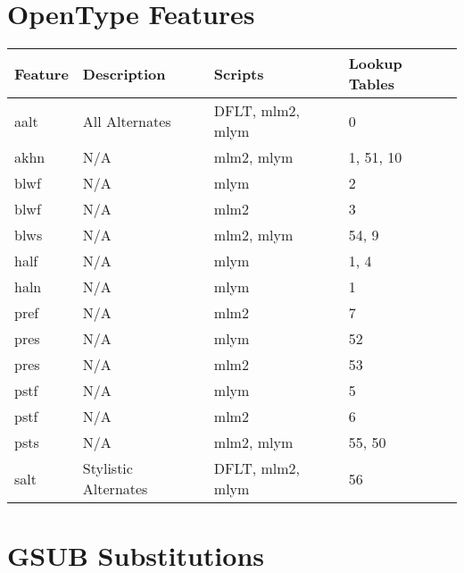 \section{OpenType Features}

    \begin{longtable}[l]{|l|p{}|p{}|l|}
    \hline
    \rowcolor{header}
    Feature & Description & Scripts & Lookup Tables \\
    \hline
    \endhead
    \hline
    \endfoot
  aalt & All Alternates & DFLT, mlm2, mlym & 0  \\
akhn & N/A & mlm2, mlym & 1, 51, 10  \\
blwf & N/A & mlym & 2  \\
blwf & N/A & mlm2 & 3  \\
blws & N/A & mlm2, mlym & 54, 9  \\
half & N/A & mlym & 1, 4  \\
haln & N/A & mlym & 1  \\
pref & N/A & mlm2 & 7  \\
pres & N/A & mlym & 52  \\
pres & N/A & mlm2 & 53  \\
pstf & N/A & mlym & 5  \\
pstf & N/A & mlm2 & 6  \\
psts & N/A & mlm2, mlym & 55, 50  \\
salt & Stylistic Alternates & DFLT, mlm2, mlym & 56  \\
\end{longtable}
\section{GSUB Substitutions}

